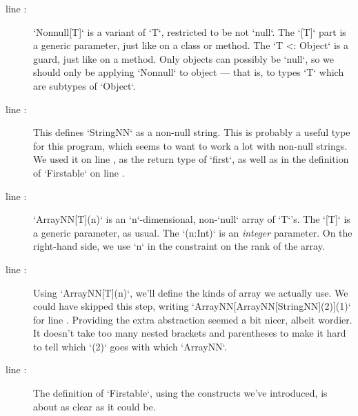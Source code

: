 \begin{description}

\item [line :]  \xcd`Nonnull[T]` is a variant
      of \xcd`T`, restricted to be not \xcd`null`.  The \xcd`[T]` part is a
      generic parameter, just like on a class or method. The 
      \xcd`{T <: Object}` is a guard, just like on a method.  Only objects can
      possibly 
      be \xcd`null`, so we should only be applying \xcd`Nonnull` to object ---
      that is, to types \xcd`T` which are subtypes of \xcd`Object`.  

\item [line :] This defines \xcd`StringNN` as
      a non-null string.  This is probably a useful type for this program,
      which seems to want to work a lot with non-null strings.  We used it on
      line , as the return type of \xcd`first`,
      as well as in the definition of \xcd`Firstable` on line
      . 

\item [line :] \xcd`ArrayNN[T](n)` is an
      \xcd`n`-dimensional, non-\xcd`null` array of \xcd`T`'s.  The \xcd`[T]`
      is a generic parameter, as usual. The \xcd`(n:Int)` is an {\em integer}
      parameter. On the right-hand side, we use \xcd`n` in the constraint on
      the rank of the array.

\item [line :] Using \xcd`ArrayNN[T](n)`, we'll
      define the kinds of array we actually use.  We could have skipped this
      step, writing \xcd`ArrayNN[ArrayNN[StringNN](2)](1)` for line 
      .  Providing the extra abstraction
      seemed a bit nicer, albeit wordier. It doesn't take too many nested
      brackets and parentheses to make it hard to tell which \xcd`(2)` goes
      with which \xcd`ArrayNN`.  

\item [line :] The definition of
      \xcd`Firstable`, using the constructs we've introduced, is about as
      clear as it could be.   
\end{description}

